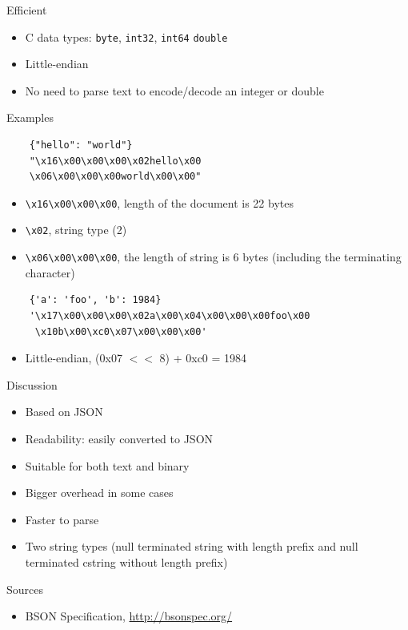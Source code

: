 \documentclass{beamer}
\begin{document}
\begin{frame}{Efficient}
    \begin{itemize}
        \item C data types: \texttt{byte}, \texttt{int32}, \texttt{int64}
                            \texttt{double}
        \item Little-endian
        \item No need to parse text to encode/decode an integer or double
    \end{itemize}
\end{frame}

\begin{frame}[fragile]{Examples}
\begin{verbatim}
    {"hello": "world"}
    "\x16\x00\x00\x00\x02hello\x00
    \x06\x00\x00\x00world\x00\x00"
\end{verbatim}
    \begin{itemize}
        \item \texttt{\textbackslash x16\textbackslash x00\textbackslash x00\textbackslash x00}, length of the document is 22 bytes
        \item \texttt{\textbackslash x02}, string type (2)
        \item \texttt{\textbackslash x06\textbackslash x00\textbackslash x00\textbackslash x00}, the length of string is 6 bytes (including the terminating character)
    \end{itemize}

\begin{verbatim}
    {'a': 'foo', 'b': 1984}
    '\x17\x00\x00\x00\x02a\x00\x04\x00\x00\x00foo\x00
     \x10b\x00\xc0\x07\x00\x00\x00'
\end{verbatim}

    \begin{itemize}
        \item Little-endian, (0x07 $<<$ 8) + 0xc0 = 1984
    \end{itemize}
    
\end{frame}

\begin{frame}{Discussion}
    \begin{itemize}
        \item Based on JSON
        \item Readability: easily converted to JSON
        \item Suitable for both text and binary
        \item Bigger overhead in some cases
        \item Faster to parse
        \item Two string types (null terminated string with length prefix and null terminated cstring without length prefix)
    \end{itemize}
\end{frame}

\begin{frame}{Sources}
    \begin{itemize}
        \item BSON Specification, \url{http://bsonspec.org/}
    \end{itemize}
\end{frame}
\end{document}
